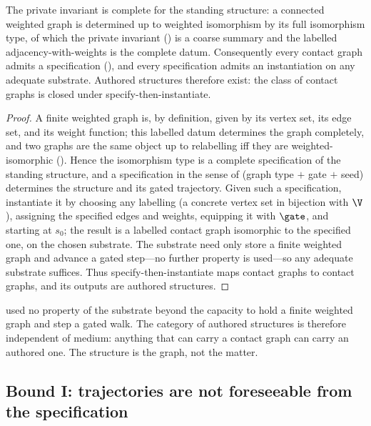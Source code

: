 \begin{theorem}
\label{thm:authored-exist}
The private invariant is complete for the standing structure: a connected
weighted graph is determined up to weighted isomorphism by its full isomorphism
type, of which the private invariant \textup{(}\textup{)} is a
coarse summary and the labelled adjacency-with-weights is the complete datum.
Consequently every contact graph admits a specification
\textup{(}\textup{)}, and every specification admits an
instantiation on any adequate substrate. Authored structures therefore exist:
the class of contact graphs is closed under specify-then-instantiate.
\end{theorem}

\begin{proof}
A finite weighted graph is, by definition, given by its vertex set, its edge
set, and its weight function; this labelled datum determines the graph
completely, and two graphs are the same object up to relabelling iff they are
weighted-isomorphic (). Hence the isomorphism type is a complete
specification of the standing structure, and a specification in the sense of
 (graph type $+$ gate $+$ seed) determines the structure and its
gated trajectory. Given such a specification, instantiate it by choosing any
labelling (a concrete vertex set in bijection with $\V$), assigning the specified
edges and weights, equipping it with $\gate$, and starting at $s_0$; the result
is a labelled contact graph isomorphic to the specified one, on the chosen
substrate. The substrate need only store a finite weighted graph and advance a
gated step---no further property is used---so any adequate substrate suffices.
Thus specify-then-instantiate maps contact graphs to contact graphs, and its
outputs are authored structures.
\end{proof}

\begin{remark}
\label{rem:substrate}
 used no property of the substrate beyond the capacity
to hold a finite weighted graph and step a gated walk. The category of authored
structures is therefore independent of medium: anything that can carry a contact
graph can carry an authored one. The structure is the graph, not the matter.
\end{remark}

\subsection{Bound I: trajectories are not foreseeable from the specification}


